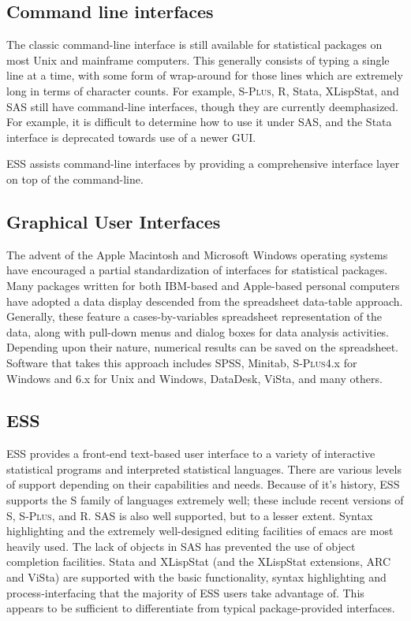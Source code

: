 \documentclass{article}
\newcommand*{\Splus}{\textsc{S-Plus}}
\begin{document}
\subsection{Command line interfaces}
\label{sec:UI:command}

The classic command-line interface is still available for statistical
packages on most Unix and mainframe computers.  This generally
consists of typing a single line at a time, with some form of
wrap-around for those lines which are extremely long in terms of
character counts.  For example, \Splus, R, Stata, XLispStat, and SAS
still have command-line interfaces, though they are currently deemphasized.
For example, it is difficult to determine how to use
it under SAS, and the Stata interface is deprecated towards use of a
newer GUI.

ESS assists command-line interfaces by providing a comprehensive
interface layer on top of the command-line.

\subsection{Graphical User Interfaces}
\label{sec:UI:GUI}

The advent of the Apple Macintosh and Microsoft Windows operating
systems have encouraged a partial standardization of interfaces for
statistical packages.  Many packages written for both IBM-based and
Apple-based personal computers have adopted a data display 
descended from the spreadsheet
data-table approach.  Generally, these feature a cases-by-variables
spreadsheet representation of the data, along with pull-down menus and
dialog boxes for data analysis activities.  Depending upon their
nature, numerical results can be saved on the spreadsheet.  Software
that takes this approach includes SPSS, Minitab, \Splus 4.x for Windows and 6.x for Unix and Windows,
DataDesk, ViSta, and many others.

\subsection{ESS}
\label{sec:UI:ESS}

ESS provides a front-end text-based user interface to a variety of
interactive statistical programs and interpreted statistical
languages.  There are various levels of support depending on their
capabilities and needs.  Because of it's history, ESS supports the S
family of languages extremely well; these include recent versions of
S, \Splus, and R.  SAS is also well supported, but to a lesser extent.
Syntax highlighting and
the extremely well-designed editing facilities of emacs are most
heavily used. 
The lack of objects in SAS has prevented the use of object completion
facilities.  Stata and XLispStat (and the XLispStat extensions, ARC
and ViSta) are supported with the basic functionality, syntax
highlighting and process-interfacing that
the majority of ESS users take advantage of.  This appears to be
sufficient to differentiate from typical package-provided interfaces.
\end{document}
